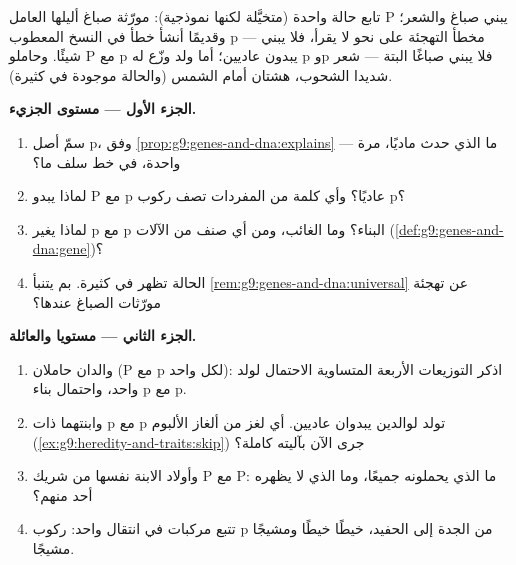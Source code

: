 \begin{problem}\label{pb:g9:genes-and-dna:1}
تابع حالة واحدة (متخيَّلة لكنها نموذجية): مورّثة صباغ
أليلها العامل P يبني صباغ  والشعر؛ وقديمًا أنشأ
خطأ في النسخ  المعطوب p --- مخطأ التهجئة على نحو
لا يقرأ، فلا يبني شيئًا. وحاملو P مع p يبدون عاديين؛
أما ولد وزّع له p وp فلا يبني صباغًا البتة --- شعر 
شديدا الشحوب،  هشتان أمام الشمس (والحالة موجودة
في  كثيرة).

\medskip\noindent\textbf{الجزء الأول --- مستوى الجزيء.}
\begin{enumerate}
  \item سمّ أصل p، وفق
        \cref{prop:g9:genes-and-dna:explains} --- ما
        الذي حدث ماديًا، مرة واحدة، في خط  سلف ما؟
  \item لماذا يبدو P مع p عاديًا؟ وأي كلمة من المفردات
        تصف ركوب p؟
  \item لماذا يغير p مع p البناء؟ وما الغائب، ومن أي صنف
        من الآلات
        (\cref{def:g9:genes-and-dna:gene})؟
  \item الحالة تظهر في  كثيرة. بم يتنبأ
        \cref{rem:g9:genes-and-dna:universal} عن تهجئة
        مورّثات الصباغ عندها؟
\end{enumerate}

\medskip\noindent\textbf{الجزء الثاني --- مستويا
 والعائلة.}
\begin{enumerate}[resume]
  \item والدان حاملان (P مع p لكل واحد): اذكر التوزيعات
        الأربعة المتساوية الاحتمال لولد واحد، واحتمال
        بناء p مع p.
  \item وابنتهما ذات p مع p تولد لوالدين يبدوان عاديين.
        أي لغز من ألغاز الألبوم
        (\cref{ex:g9:heredity-and-traits:skip}) جرى الآن
        بآليته كاملة؟
  \item وأولاد الابنة نفسها من شريك P مع P: ما الذي
        يحملونه جميعًا، وما الذي لا يظهره أحد منهم؟
  \item تتبع مركبات  في انتقال واحد: ركوب p من
        الجدة إلى الحفيد، خيطًا خيطًا ومشيجًا مشيجًا.
\end{enumerate}


\end{problem}
